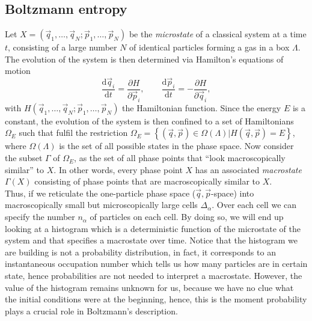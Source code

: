 \subsection{ Boltzmann entropy}
Let  $X=(\vec{q}_1,\ldots,\vec{q}_N;\vec{p}_1,\ldots,\vec{p}_N)$ be the \textit{microstate} of a classical system at a time $t$, consisting of a large number $N$ of identical particles forming a gas in a box $\Lambda$. The evolution of the system is then determined via Hamilton's equations of motion
\begin{equation}
\frac{\mathrm{d} \vec{q}_i}{ \mathrm{d} t} = \frac{\partial H}{\partial \vec{p}_i}, \qquad \frac{\mathrm{d} \vec{p}_i}{ \mathrm{d} t} = -\frac{\partial H}{\partial \vec{q}_i},
\end{equation}
with $H(\vec{q}_1,\ldots,\vec{q}_N;\vec{p}_1,\ldots,\vec{p}_N)$ the Hamiltonian function. Since the energy $E$ is a constant, the evolution of the system is then confined to a set of Hamiltonians $\Omega_{E}$ such that fulfil the restriction $\Omega_{E}=\left\{(\vec{q},\vec{p})\in \Omega(\Lambda) | H(\vec{q},\vec{p})=E\right\}$, where $\Omega(\Lambda)$ is the set of all possible states in the phase space. Now consider the subset $\Gamma$ of $\Omega_E$, as the set of all phase points that ``look macroscopically similar'' to $X$. In other words, every phase point $X$ has an associated \textit{macrostate}  $\Gamma(X)$ consisting of phase points that are macroscopically similar to $X$.\\
 \indent Thus, if we reticulate the one-particle phase space ($\vec{q},\vec{p}$-space) into macroscopically small but microscopically large cells $\Delta_{\alpha}$. Over each cell we can specify the number $n_\alpha$ of particles on each cell. By doing so, we will end up looking at a histogram which is a deterministic function of the microstate of the system and that specifies a macrostate over time. Notice that the histogram we are building is not a probability distribution, in fact, it corresponds to an instantaneous occupation number which tells us how many particles are in certain state, hence probabilities are not needed to interpret a macrostate. However, the value of the histogram remains unknown for us, because we have no clue what the initial conditions were at the beginning, hence, this is the moment probability plays a crucial role in Boltzmann's description.\\
 

